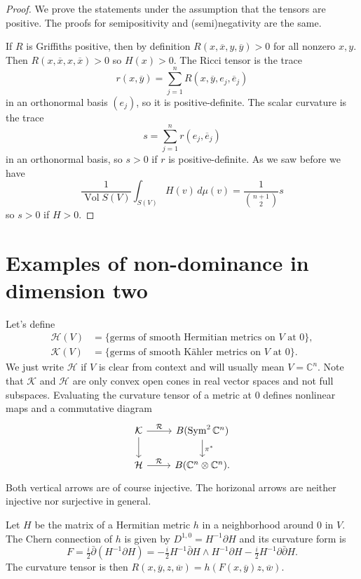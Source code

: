 \documentclass[10pt,a4paper]{amsart}
\theoremstyle{definition}
\def\ov#1{\overline{#1}}
\newcommand{\kk}[1]{\mathbb{#1}}
\newcommand{\cc}[1]{\mathcal{#1}}
\DeclareMathOperator{\Vol}{Vol}
\begin{document}
\begin{proof}
We prove the statements under the assumption that the tensors are positive.
The proofs for semipositivity and (semi)negativity are the same.

If $R$ is Griffiths positive, then by definition $R(x, \ov x, y, \ov y) > 0$
for all nonzero $x, y$. Then $R(x, \ov x, x, \ov x) > 0$ so $H(x) > 0$.
The Ricci tensor is the trace
$$
r(x, \ov y) = \sum_{j = 1}^n R(x, \ov y, e_j, \ov e_j)
$$
in an orthonormal basis $(e_j)$, so it is positive-definite.
The scalar curvature is the trace
$$
s = \sum_{j=1}^n r(e_j, \ov e_j)
$$
in an orthonormal basis, so $s > 0$ if $r$ is positive-definite.
As we saw before we have
\[
\frac{1}{\Vol S(V)}
\int_{S(V)} H(v) \, d\mu(v)
= \frac{1}{\binom{n+1}{2}} s
\]
so $s > 0$ if $H > 0$.
\end{proof}



\section{Examples of non-dominance in dimension two}

Let's define
\begin{align*}
\cc H(V)
&= \{ \text{germs of smooth Hermitian metrics on $V$ at $0$} \},
\\
\cc K(V)
&= \{ \text{germs of smooth K\"ahler metrics on $V$ at $0$} \}.
\end{align*}
We just write $\cc H$ if $V$ is clear from context and will usually mean $V =
\kk C^n$. Note that $\cc K$ and $\cc H$ are only convex open cones in real
vector spaces and not full subspaces.
Evaluating the curvature tensor of a metric at $0$ defines nonlinear maps and a
commutative diagram
$$
\begin{tikzcd}
\cc K \ar[d] \ar[r,"\cc R"] & B(\operatorname{Sym}^2 \kk C^n)\ar[d,"\pi^*"]
\\
\cc H \ar[r, "\cc R"] & B(\kk C^n \otimes \kk C^n).
\end{tikzcd}
$$
Both vertical arrows are of course injective.
The horizonal arrows are neither injective nor surjective in general.


Let $H$ be the matrix of a Hermitian metric $h$ in a neighborhood around $0$ in
$V$. The Chern connection of $h$ is given by $D^{1,0} = H^{-1}\partial H$ and its
curvature form is
$$
F = \tfrac i2 \bar\partial(H^{-1}\partial H)
= - \tfrac i2 H^{-1} \bar\partial H \wedge H^{-1} \partial H
- \tfrac i2 H^{-1} \partial \bar\partial H.
$$
The curvature tensor is then $R(x,\ov y, z, \ov w) = h(F(x, \ov y) z, \ov w)$.
\end{document}
